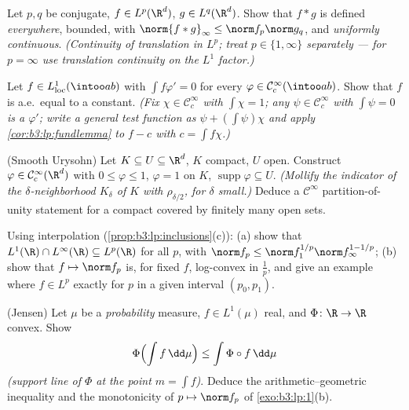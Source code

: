 \begin{exercise}[$\star\star$]\label{exo:b3:lp:6}
Let $p, q$ be conjugate, $f \in L^p(\R^d)$, $g \in
L^q(\R^d)$. Show that $f * g$ is defined \emph{everywhere},
bounded, with $\norm{f*g}_\infty \leq \norm f_p\norm g_q$, and
\emph{uniformly continuous}. \emph{(Continuity of translation
in $L^p$; treat $p \in \{1, \infty\}$ separately --- for $p =
\infty$ use translation continuity on the $L^1$ factor.)}
\end{exercise}

\begin{exercise}[$\star\star$]\label{exo:b3:lp:7}
Let $f \in L^1_{\mathrm{loc}}(\intoo ab)$ with
$\int f\varphi' = 0$ for every $\varphi \in \mathcal
C^\infty_c(\intoo ab)$. Show that $f$ is a.e.\ equal to a
constant. \emph{(Fix $\chi \in \mathcal C_c^\infty$ with
$\int\chi = 1$; any $\psi \in \mathcal C_c^\infty$ with
$\int\psi = 0$ is a $\varphi'$; write a general test function
as $\psi + (\int\psi)\chi$ and apply
\cref{cor:b3:lp:fundlemma} to $f - c$ with $c = \int
f\chi$.)}
\end{exercise}

\begin{exercise}[$\star\star\star$]\label{exo:b3:lp:8}
(Smooth Urysohn) Let $K \subseteq U \subseteq \R^d$, $K$
compact, $U$ open. Construct $\varphi \in \mathcal
C^\infty_c(\R^d)$ with $0 \leq \varphi \leq 1$, $\varphi = 1$
on $K$, $\operatorname{supp}\varphi \subseteq U$.
\emph{(Mollify the indicator of the $\delta$-neighborhood
$K_\delta$ of $K$ with $\rho_{\delta/2}$, for $\delta$ small.)}
Deduce a $\mathcal C^\infty$ partition-of-unity statement for
a compact covered by finitely many open sets.
\end{exercise}

\begin{exercise}[$\star\star$]\label{exo:b3:lp:9}
Using interpolation (\cref{prop:b3:lp:inclusions}(c)):
(a) show that $L^1(\R)\cap L^\infty(\R) \subseteq L^p(\R)$ for
all $p$, with $\norm f_p \leq \norm f_1^{1/p}\norm
f_\infty^{1 - 1/p}$;
(b) show that $f \mapsto \norm f_p$ is, for fixed $f$,
log-convex in $\frac1p$, and give an example where $f \in L^p$
exactly for $p$ in a given interval $(p_0, p_1)$.
\end{exercise}

\begin{exercise}[$\star\star$]\label{exo:b3:lp:10}
(Jensen) Let $\mu$ be a \emph{probability} measure, $f \in
L^1(\mu)$ real, and $\Phi \colon \R \to \R$ convex. Show
\[
\Phi\Bigl(\int f\,\dd\mu\Bigr) \leq \int \Phi\circ
f\,\dd\mu
\]
\emph{(support line of $\Phi$ at the point $m = \int f$)}.
Deduce the arithmetic--geometric inequality and the
monotonicity of $p \mapsto \norm f_p$ of
\cref{exo:b3:lp:1}(b).
\end{exercise}

